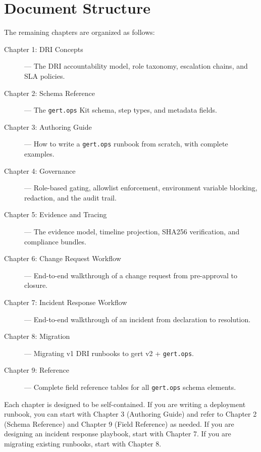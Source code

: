\section{Document Structure}

The remaining chapters are organized as follows:

\begin{description}
  \item[Chapter 1: DRI Concepts] — The DRI accountability model, role taxonomy, escalation chains, and SLA policies.
  \item[Chapter 2: Schema Reference] — The \texttt{gert.ops} Kit schema, step types, and metadata fields.
  \item[Chapter 3: Authoring Guide] — How to write a \texttt{gert.ops} runbook from scratch, with complete examples.
  \item[Chapter 4: Governance] — Role-based gating, allowlist enforcement, environment variable blocking, redaction, and the audit trail.
  \item[Chapter 5: Evidence and Tracing] — The evidence model, timeline projection, SHA256 verification, and compliance bundles.
  \item[Chapter 6: Change Request Workflow] — End-to-end walkthrough of a change request from pre-approval to closure.
  \item[Chapter 7: Incident Response Workflow] — End-to-end walkthrough of an incident from declaration to resolution.
  \item[Chapter 8: Migration] — Migrating v1 DRI runbooks to gert v2 + \texttt{gert.ops}.
  \item[Chapter 9: Reference] — Complete field reference tables for all \texttt{gert.ops} schema elements.
\end{description}

Each chapter is designed to be self-contained. If you are writing a deployment runbook, you can start with Chapter 3 (Authoring Guide) and refer to Chapter 2 (Schema Reference) and Chapter 9 (Field Reference) as needed. If you are designing an incident response playbook, start with Chapter 7. If you are migrating existing runbooks, start with Chapter 8.
